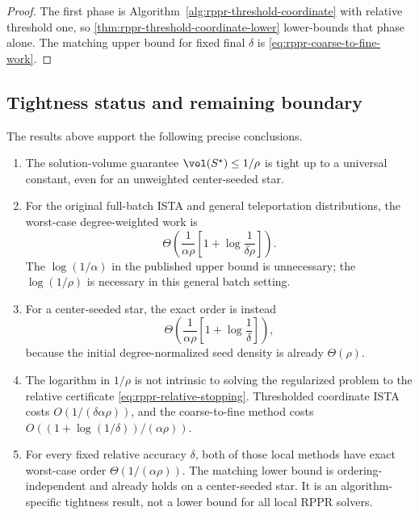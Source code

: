 \begin{proof}
The first phase is Algorithm~\ref{alg:rppr-threshold-coordinate} with
relative threshold one, so
\cref{thm:rppr-threshold-coordinate-lower} lower-bounds that phase alone.
The matching upper bound for fixed final \(\delta\) is
\cref{eq:rppr-coarse-to-fine-work}.
\end{proof}

\subsection{Tightness status and remaining boundary}
\label{subsec:rppr-tightness-status}

The results above support the following precise conclusions.

\begin{enumerate}[leftmargin=*]
    \item The solution-volume guarantee
    \(\vol(S^\star)\leq1/\rho\) is tight up to a universal constant, even for
    an unweighted center-seeded star.

    \item For the original full-batch ISTA and general teleportation
    distributions, the worst-case degree-weighted work is
    \[
        \Theta\left(
            \frac{1}{\alpha\rho}
            \left[1+\log\frac{1}{\delta\rho}\right]
        \right).
    \]
    The \(\log(1/\alpha)\) in the published upper bound is unnecessary; the
    \(\log(1/\rho)\) is necessary in this general batch setting.

    \item For a center-seeded star, the exact order is instead
    \[
        \Theta\left(
            \frac{1}{\alpha\rho}
            \left[1+\log\frac1\delta\right]
        \right),
    \]
    because the initial degree-normalized seed density is already
    \(\Theta(\rho)\).

    \item The logarithm in \(1/\rho\) is not intrinsic to solving the
      regularized problem to the relative certificate
      \cref{eq:rppr-relative-stopping}.  Thresholded coordinate ISTA costs
      \(O(1/(\delta\alpha\rho))\), and the coarse-to-fine method costs
      \(O((1+\log(1/\delta))/(\alpha\rho))\).

    \item For every fixed relative accuracy \(\delta\), both of those local
      methods have exact worst-case order \(\Theta(1/(\alpha\rho))\).  The
      matching lower bound is ordering-independent and already holds on a
      center-seeded star.  It is an algorithm-specific tightness result, not
      a lower bound for all local RPPR solvers.


\end{enumerate}

